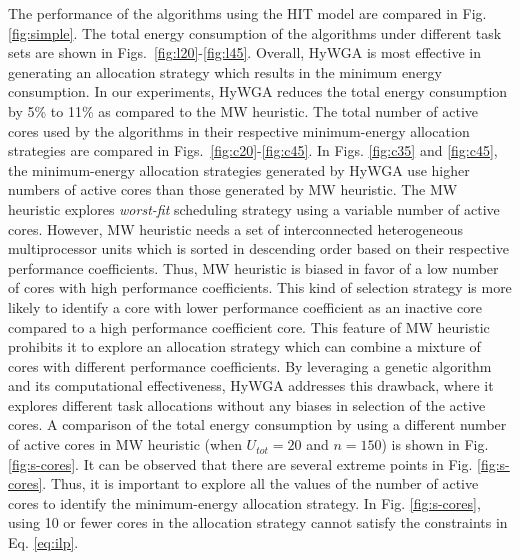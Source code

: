 \documentclass[conference]{IEEEtran}
\begin{document}
The performance of the algorithms using the HIT model are compared in Fig. \ref{fig:simple}.
The total energy consumption of the algorithms under different task sets are shown in Figs.~\ref{fig:l20}-\ref{fig:l45}.
Overall, HyWGA is most effective in generating an allocation strategy which results in the minimum energy consumption. 
In our experiments, HyWGA reduces the total energy consumption by 5\% to 11\% as compared to the MW heuristic.
The total number of active cores used by the algorithms in their respective minimum-energy allocation strategies
are compared in Figs.~\ref{fig:c20}-\ref{fig:c45}. 
In Figs. \ref{fig:c35} and \ref{fig:c45}, the minimum-energy allocation strategies
generated by HyWGA use higher numbers of active cores than those generated by MW heuristic.
The MW heuristic explores \emph{worst-fit} scheduling strategy using a variable number of active cores. However, MW heuristic needs  a set
of interconnected heterogeneous multiprocessor units which is sorted in descending order based on their respective performance coefficients.
Thus, MW heuristic is biased in favor of a low number of cores with high performance coefficients. This kind of selection strategy is more likely to identify
a core with lower performance coefficient as an inactive core compared to a high performance coefficient core. 
This feature of MW heuristic prohibits it to explore an allocation strategy which can combine a mixture of cores with different 
performance coefficients. 
By leveraging a genetic algorithm and its computational effectiveness, HyWGA addresses this drawback, where it explores different task allocations without any biases in selection of the active cores. 
A comparison of the total energy consumption by using a different number of active cores in MW heuristic (when $U_{tot}=20$ and $n=150$)
is shown in Fig. \ref{fig:s-cores}. It can be observed that there are several extreme points in Fig. \ref{fig:s-cores}. 
Thus, it is important to explore all the values of the number of active cores to identify the minimum-energy allocation strategy. In Fig. \ref{fig:s-cores}, 
using 10 or fewer cores in the allocation strategy cannot satisfy the constraints in Eq. \ref{eq:ilp}. 
\end{document}
